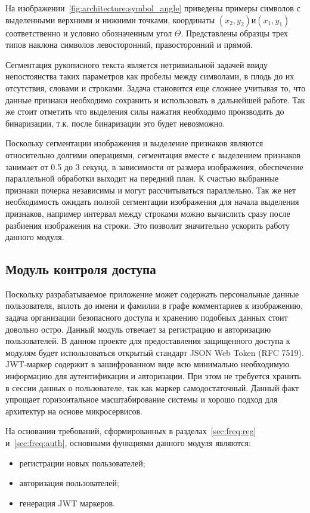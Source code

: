На изображении~\ref{fig:architecture:symbol_angle} приведены примеры символов с выделенными верхними и нижними точками, координаты $ (x_2, y_2) и (x_1, y_1) $ соответственно и условно обозначенным угол $ \Theta $. Представлены образцы трех типов наклона символов левосторонний, правосторонний и прямой.

Сегментация рукописного текста является нетривиальной задачей ввиду непостоянства таких параметров как пробелы между символами, в плодь до их отсутствия, словами и строками. Задача становится еще сложнее учитывая то, что данные признаки необходимо сохранить и использовать в дальнейшей работе. Так же стоит отметить что выделения силы нажатия необходимо производить до бинаризации, т.к. после бинаризации это будет невозможно.

Поскольку сегментации изображения и выделение признаков являются относительно долгими операциями, сегментация вместе с выделением признаков занимает от 0.5 до 3 секунд, в зависимости от размера изображения, обеспечение параллельной обработки выходит на передний план. К счастью выбранные признаки почерка независимы и могут рассчитываться параллельно. Так же нет необходимость ожидать полной сегментации изображения для начала выделения признаков, например интервал между строками можно вычислить сразу после разбиения изображения на строки. Это позволит значительно ускорить работу данного модуля.

\subsection{Модуль контроля доступа}
Поскольку разрабатываемое приложение может содержать персональные данные пользователя, вплоть до имени и фамилии в графе комментариев к изображению, задача организации безопасного доступа и хранению подобных данных стоит довольно остро.
Данный модуль отвечает за регистрацию и авторизацию пользователей. 
В данном проекте для предоставления защищенного доступа к модулям будет использоваться открытый стандарт JSON Web Token (RFC 7519). JWT-маркер  содержит в зашифрованном виде всю минимально необходимую информацию для аутентификации и авторизации. При этом не требуется хранить в сессии данных о пользователе, так как маркер самодостаточный. Данный факт упрощает горизонтальное масштабирование системы и хорошо подход для архитектур на основе микросервисов.

На основании требований, сформированных в разделах~\ref{sec:freq:reg} и~\ref{sec:freq:auth}, основными функциями данного модуля являются:
\begin{itemize}
  \item регистрации новых пользователей;
  \item авторизация пользователей;
  \item генерация JWT маркеров.
\end{itemize}

